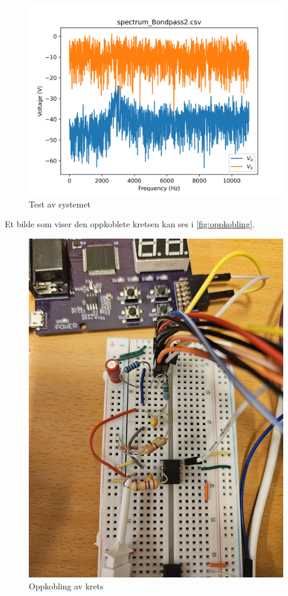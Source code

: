 \begin{figure} [!h]
\centering
\includegraphics[width=0.8\linewidth]{Bilder/spectrum_Bondpass2.png}
\caption{Test av systemet}
\label{fig:systemTest}
\end{figure}

Et bilde som viser den oppkoblete kretsen kan ses i \autoref{fig:oppkobling}.

\begin{figure} [!h]
\centering
\includegraphics[width=0.6\linewidth]{Bilder/oppkobling.jpg}
\caption{Oppkobling av krets}
\label{fig:oppkobling}
\end{figure}
